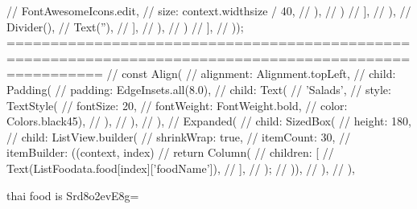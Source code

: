 //                           FontAwesomeIcons.edit,
//                           size: context.widthsize / 40,
//                         ),
//                       )
//                     ],
//                   ),
//                   Divider(),
//                   Text(''),
//                 ],
//               ),
//             )
//           ],
//         ));
=======================================================================================================
// const Align(
                //   alignment: Alignment.topLeft,
                //   child: Padding(
                //     padding: EdgeInsets.all(8.0),
                //     child: Text(
                //       'Salads',
                //       style: TextStyle(
                //           fontSize: 20,
                //           fontWeight: FontWeight.bold,
                //           color: Colors.black45),
                //     ),
                //   ),
                // ),
                // Expanded(
                //   child: SizedBox(
                //     height: 180,
                //     child: ListView.builder(
                //         shrinkWrap: true,
                //         itemCount: 30,
                //         itemBuilder: ((context, index) {
                //           return Column(
                //             children: [
                //               Text(ListFoodata.food[index]['foodName']),
                //             ],
                //           );
                //         })),
                //   ),
                // ),

thai food is Srd8o2evE8g=


